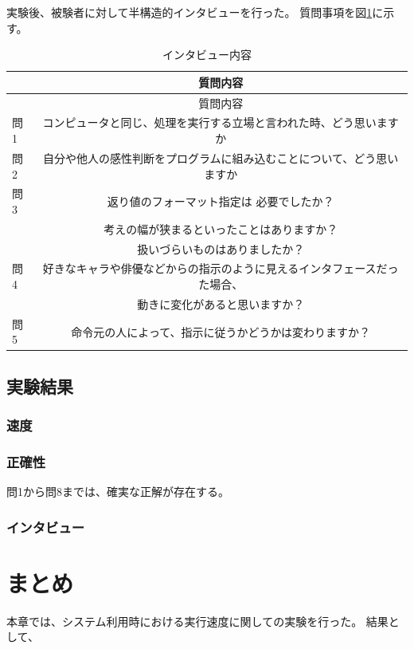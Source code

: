 実験後、被験者に対して半構造的インタビューを行った。
質問事項を図\ref{table:interview}に示す。

\begin{longtable}[c]{@{}lc@{}}
\caption{インタビュー内容 \label{table:interview}}\tabularnewline
\toprule
& 質問内容\tabularnewline
\midrule
\endfirsthead
\toprule
& 質問内容\tabularnewline
\midrule
\endhead
問1 &
コンピュータと同じ、処理を実行する立場と言われた時、どう思いますか\tabularnewline
問2 &
自分や他人の感性判断をプログラムに組み込むことについて、どう思いますか\tabularnewline
問3 & 返り値のフォーマット指定は 必要でしたか？ \tabularnewline
& 考えの幅が狭まるといったことはありますか？ \tabularnewline
& 扱いづらいものはありましたか？\tabularnewline
問4 &
好きなキャラや俳優などからの指示のように見えるインタフェースだった場合、\tabularnewline
& 動きに変化があると思いますか？\tabularnewline
問5 &
命令元の人によって、指示に従うかどうかは変わりますか？\tabularnewline
\bottomrule
\end{longtable}

\subsection{実験結果}\label{ux5b9fux9a13ux7d50ux679c}

\subsubsection{速度}\label{ux901fux5ea6}

\subsubsection{正確性}\label{ux6b63ux78baux6027}

問1から問8までは、確実な正解が存在する。

\subsubsection{インタビュー}\label{ux30a4ux30f3ux30bfux30d3ux30e5ux30fc}

\section{まとめ}\label{ux307eux3068ux3081}

本章では、システム利用時における実行速度に関しての実験を行った。
結果として、
